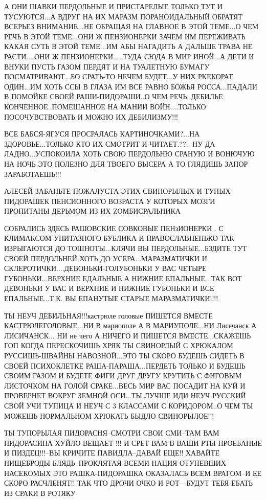 А ОНИ  ШАВКИ ПЕРДОЛЬНЫЕ И ПРИСТАРЕЛЫЕ ТОЛЬКО ТУТ И ТУСУЮТСЯ...А ВДРУГ НА ИХ
МАРАЗМ ПОРАНОИДАЛЬНЫЙ ОБРАТЯТ ВСЕРЬЕЗ ВНИМАНИЕ...НЕ ОБРАЩАЯ НА ГЛАВНОЕ В ЭТОЙ
ТЕМЕ...О ЧЕМ РЕЧЬ В ЭТОЙ ТЕМЕ...ОНИ Ж ПЕНЗИОНЕРКИ ЗАЧЕМ ИМ ПЕРЕЖИВАТЬ КАКАЯ
СУТЬ В ЭТОЙ ТЕМЕ...ИМ АБЫ НАГАДИТЬ А ДАЛЬШЕ ТРАВА НЕ РАСТИ....ОНИ Ж
ПЕНЗИОНЕРКИ.....ТУДА СЮДА В МИР ИНОЙ...А ДЕТИ И ВНУКИ ПУСТЬ ГАЗОМ ПЕРДЯТ И НА
ТУАЛЕТНУЮ БУМАГУ ПОСМАТРИВАЮТ...БО СРАТЬ-ТО НЕЧЕМ БУДЕТ...У НИХ РКЕКОРАТ
ОДИН...ИМ ХОТЬ ССЫ В ГЛАЗА ИМ ВСЕ РАВНО БОЖЬЯ РОССА...ПАДАЛИ В ПОМОЙКЕ СВОЕЙ
РАШИ-ПИДОРАШИ..О ЧЕМ РЕЧЬ..ДЕБИЛЬЕ КОНЧЕННОЕ..ПОМЕШАННОЕ НА МАНИИ
ВОЙН....ТОЛЬКО ПОСОЧУВСТВОВАТЬ И МОЖНО ИХ ДЕБИЛИЗМУ!!!

ВСЕ БАБСЯ-ЯГУСЯ ПРОСРАЛАСЬ КАРТИНОЧКАМИ?...НА ЗДОРОВЬЕ...ТОЛЬКО КТО ИХ СМОТРИТ
И ЧИТАЕТ.??.. НУ ДА ЛАДНО...УСПОКОИЛА ХОТЬ СВОЮ ПЕРДОЛЬНЮ СРАНУЮ И ВОНЮЧУЮ НА
НОЧЬ   ЭТО ПОЛЕЗНО ДЛЯ ТВОЕГО ВЫСЕРА А ТО ГЛЯДИШЬ ЗАПОР ЗАРАБОТАЕШЬ!!!

АЛЕСЕЙ ЗАБАНЬТЕ ПОЖАЛУСТА ЭТИХ СВИНОРЫЛЫХ И ТУПЫХ ПИДОРАШЕК ПЕНСИОННОГО
ВОЗРАСТА У КОТОРЫХ МОЗГИ ПРОПИТАНЫ ДЕРЬМОМ ИЗ ИХ ZОМБИСРАЛЬНИКА


СОБРАЛИСЬ ЗДЕСЬ РАШОВСКИЕ СОВКОВЫЕ ПЕНзИОНЕРКИ . С КЛИМАКСОМ УНИТАЗНОГО БУБЛИКА
И ПРАВОСЛАВНЕНЬКО ТАК ИЗРЫГАЮТСЯ ДО ТОШНОТЫ...КЛЯЧИ ВЫ ПЕРДОЛЬНЫЕ...БЗДИТЕ ТУТ
СВОЕЙ ПЕРДОЛЬНЕЙ ХОТЬ ДО УСЕРА...МАРАЗМАТИЧКИ И
СКЛЕРОТИЧКИ....ДЕВОНЬКИ-ГОЛУБОНЬКИ У ВАС ЧЕТЫРЕ ГУБОНЬКИ...ВЕРХНИЕ ЕДАЛЬНЫЕ А
НИЖНИЕ ЕПАЛЬНЫЕ...ТАК ВОТ ДЕВОНЬКИ У ВАС И ВЕРХНИЕ И НИЖНИЕ ГУБОНЬКИ И ВСЕ
ЕПАЛЬНЫЕ...Т.К. ВЫ ЕПАНУТЫЕ СТАРЫЕ МАРАЗМАТИЧКИ!!!!            

ТЫ НЕУЧ ДЕБИЛЬНАЯ!!!кастрюле головые ПИШЕТСЯ ВМЕСТЕ КАСТРЮЛЕГОЛОВЫЕ...НИ В
мариополе А В МАРИУПОЛЕ...НИ Лисечанск А ЛИСИЧАНСК... НИ не чего А НИЧЕГО И
ПИШЕТСЯ ВМЕСТЕ...СКАЖЕШЬ ГОП КОГДА ПЕРЕСКОЧИШЬ ХРЯК ТЫ СВИНОРЛЫЙ С ХРЮКАЛОМ
РУССИШЬ-ШВАЙНЫ НАВОЗНОЙ...ЭТО ТЫ СКОРО БУДЕШЬ СИДЕТЬ В СВОЕЙ ПСИХОКЛЕТКЕ
РАША-ПАРАША...ПЕРДЕТЬ ТОЛЬКО И БУДЕШЬ СВОИМ ГАЗОМ И БУДЕТЕ ФИГИ ДРУГ ДРУГУ
КРУТИТЬ С ФИГОВЫМ ЛИСТОЧКОМ НА ГОЛОЙ СРАКЕ...ВЕСЬ МИР ВАС ПОСАДИТ НА КУЙ И
ПРОВЕРНЕТ ВОКРУГ ЗЕМНОЙ ОСИ...ТЫ ЛУЧШЕ ИДИ НЕУЧ РУССКИЙ СВОЙ УЧИ ТУПИЦА И НЕУЧ
С 3 КЛАССАМИ С КОРИДОРОМ..О ЧЕМ ТЫ МОЖЕШЬ НОРМАЛЬНОМ ХРЮКАТЬ БЫДЛО
СВИНОРЫЛОЕ!!!       

ТЫ ТУПОРЫЛАЯ ПИДОРАСНЯ--СМОТРИ СВОИ СМИ--ТАМ ВАМ ПИДОРАСИНА ХУЙЛО ВЕЩАЕТ !!! И
СРЕТ ВАМ В ВАШИ РТЫ ПРОЕБАНЫЕ И ПИЗДЕЦ!!!--ВЫ КРИЧИТЕ ПАВИДЛА--ДАВАЙ ЕЩЕ!!
ХАВАЙТЕ НИЩЕБРОДЫ БЛЯДЬ--ПРОКЛЯТАЯ ВСЕМИ НАЦИЯ ОТУПЕВШИХ НАСЕКОМЫХ ЭТО
РАШКА-ПИДОРАШКА ОКАЗАЛАСЬ ВСЕМ ВРАГОМ--И ЕЕ СКОРО РАСЧЛЕНЯТ!! ТАК ЧТО ДРОЧИ
ОЧКО И РОТ---БУДУТ ТЕБЯ ЕБАТЬ ИЗ СРАКИ В РОТЯКУ

